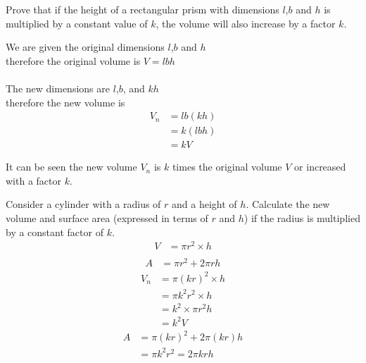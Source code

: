 \begin{wex}{}
 {
Prove that if the height of a rectangular prism with dimensions $l$,$b$ and $h$ is multiplied by a
constant value of $k$, the volume will also increase by a factor $k$.
}
{
\westep{}
We are given the original dimensions $l$,$b$ and $h$\\
therefore the original volume is $V = lbh$\\
\\
The new dimensions are $l$,$b$, and $kh$\\
therefore the new volume is 
\begin{align*}
V_n &= lb(kh)\\
& = k(lbh)\\
&= kV
\end{align*}

It can be seen the new volume $V_n$ is $k$ times the original volume $V$ or increased with a factor
$k$.
}
\end{wex}

\begin{wex}{}
{Consider a cylinder with a radius of $r$ and a height of $h$. Calculate the new volume and surface area (expressed in terms of $r$ and $h$)
if the radius is multiplied by a constant factor of $k$.}
{
\begin{align*}
 V&= \pi r^2 \times h\\
\end{align*}
\begin{align*}
A&= \pi r^2 + 2\pi rh
\end{align*}
\begin{align*}
 V_n&= \pi (kr)^{2} \times h\\
&= \pi k^{2}r^{2} \times h\\
&=k^{2} \times \pi r^{2} h\\
&= k^{2}V
\end{align*}
\begin{align*}
A&= \pi (kr)^{2} + 2\pi (kr)h\\
&= \pi k^{2}r^{2} = 2\pi krh 
\end{align*}
}
\end{wex}

